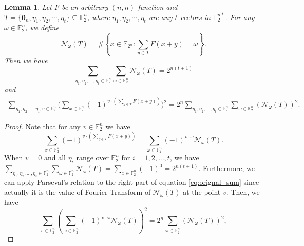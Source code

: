 \documentclass[12 pt]{article}
\newtheorem{lemma}{Lemma}
\def\F{{\mathbb F}}
\begin{document}
{\begin{lemma}\label{L:SumSqurNew}
Let $F$ be an arbitrary $(n, n)$-function and $T=\{\mathbf{0}_n, \eta_1, \eta_2, \cdots, \eta_t\}\subseteq \F_2^n$,
where $\eta_1, \eta_2, \cdots, \eta_t$ are any $t$ vectors in $\F_2^{n*}$.
For any $\omega\in\F_2^n$,  we define
\begin{equation*}
\mathcal{N}_\omega(T)=\#\left\{x\in\F_{2^n} : \sum_{y\in T}F(x+y)=\omega\right\}.
\end{equation*}
Then we have
\begin{equation*}
  \sum_{\eta_1,\eta_2,\dots,\eta_t\in\F_2^n}\sum_{\omega\in\F_2^n}\mathcal{N}_\omega(T)=2^{n(t+1)}
\end{equation*}
 and
\begin{eqnarray*}
  \sum_{\eta_1,\eta_2, \cdots, \eta_t,v \in\F_2^n}\Big(\sum_{x\in\F_2^n}(-1)^{v\cdot\left(\sum_{y\in T}F(x+y)\right)}\Big)^2=2^n\sum_{\eta_1,\eta_2,\dots,\eta_t\in\F_2^n}\sum_{\omega\in\F_2^n}\left( \mathcal{N}_{\omega}(T) \right)^2.
\end{eqnarray*}
\end{lemma}

\begin{proof}
  Note that for any $ v\in\F_2^n $ we have 
  \begin{equation}\label{eq:orignal_sum}
    \sum_{x\in\F_2^n}(-1)^{v\cdot\left(\sum_{y\in T}F(x+y)\right)}=\sum_{\omega\in\F_2^n}(-1)^{v\cdot\omega}\mathcal{N}_{\omega}(T).
  \end{equation}
  When $ v=0 $ and all $ \eta_i $ range over $ \F_2^n $ for $ i=1,2,...,t $, 
  we have $ \sum_{\eta_1,\eta_2,\dots,\eta_t\in\F_2^n}\sum_{\omega\in\F_2^n}\mathcal{N}_{\omega}(T)=\sum_{x\in\F_2^n}(-1)^0=2^{n(t+1)} $.  
  Furthermore, we can apply Parseval's relation to the right part of equation \eqref{eq:orignal_sum} 
  since actually it is the value of Fourier Transform of $ \mathcal{N}_{\omega}(T) $ at the point $ v $. 
  Then, we have
  \[\sum_{v\in\F_2^n}\left( \sum_{\omega\in\F_2^n}(-1)^{v\cdot\omega}\mathcal{N}_{\omega}(T)\right)^2 = 2^n\sum_{\omega\in\F_2^n}\left( \mathcal{N}_{\omega}(T) \right)^2,\] 



\end{proof}}
\end{document}
